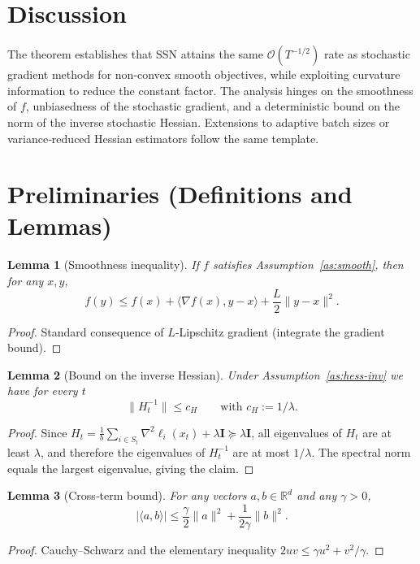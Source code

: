 \documentclass{article}
\newtheorem{lemma}{Lemma}
\newcommand{\ip}[2]{\langle #1,#2\rangle}
\newcommand{\Id}{\mathbf I}
\begin{document}
\section*{Discussion}
The theorem establishes that SSN attains the same $\mathcal{O}(T^{-1/2})$ rate as stochastic gradient methods for non‑convex smooth objectives, while exploiting curvature information to reduce the constant factor. The analysis hinges on the smoothness of $f$, unbiasedness of the stochastic gradient, and a deterministic bound on the norm of the inverse stochastic Hessian. Extensions to adaptive batch sizes or variance‑reduced Hessian estimators follow the same template.

\newpage
\section*{Preliminaries (Definitions and Lemmas)}
\begin{lemma}[Smoothness inequality]\label{lem:smooth}
If $f$ satisfies Assumption~\ref{as:smooth}, then for any $x,y$,
\[
f(y)\le f(x)+\ip{\nabla f(x)}{y-x}+\frac{L}{2}\|y-x\|^2 .
\tag{2}
\]
\end{lemma}
\begin{proof}
Standard consequence of $L$‑Lipschitz gradient (integrate the gradient bound). \end{proof}

\begin{lemma}[Bound on the inverse Hessian]\label{lem:inv-bound}
Under Assumption~\ref{as:hess-inv} we have for every $t$
\[
\|H_t^{-1}\|\le c_H\qquad\text{with }c_H:=1/\lambda .
\tag{3}
\]
\end{lemma}
\begin{proof}
Since $H_t=\frac1b\sum_{i\in S_t}\nabla^2\ell_i(x_t)+\lambda\Id\succeq\lambda\Id$, all eigenvalues of $H_t$ are at least $\lambda$, and therefore the eigenvalues of $H_t^{-1}$ are at most $1/\lambda$. The spectral norm equals the largest eigenvalue, giving the claim. \end{proof}

\begin{lemma}[Cross‑term bound]\label{lem:cross}
For any vectors $a,b\in\mathbb{R}^d$ and any $\gamma>0$,
\[
\big|\langle a,b\rangle\big|\le \frac{\gamma}{2}\|a\|^2+\frac{1}{2\gamma}\|b\|^2 .
\tag{4}
\]
\end{lemma}
\begin{proof}
Cauchy–Schwarz and the elementary inequality $2uv\le \gamma u^2+v^2/\gamma$. \end{proof}
\end{document}
